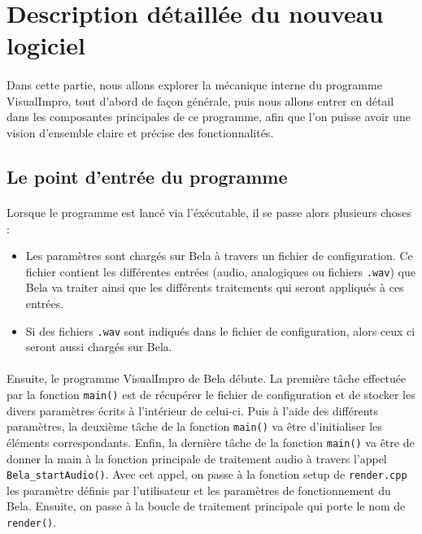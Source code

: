 \newpage

\section{Description détaillée du nouveau logiciel}
\paragraph{}
Dans cette partie, nous allons explorer la mécanique interne du programme VisualImpro, tout d'abord de façon générale, puis nous allons entrer en détail dans les composantes principales de ce programme, afin que l'on puisse avoir une vision d'ensemble claire et précise des fonctionnalités.
\subsection{Le point d'entrée du programme}
\paragraph{}
Lorsque le programme est lancé via l'éxécutable, il se passe alors plusieurs choses :
\begin{itemize}
    \item Les paramètres sont chargés sur Bela à travers un fichier de configuration. Ce fichier contient les différentes entrées (audio, analogiques ou fichiers \verb!.wav!) que Bela va traiter ainsi que les différents traitements qui seront appliqués à ces entrées.
    \item Si des fichiers \verb!.wav! sont indiqués dans le fichier de configuration, alors ceux ci seront aussi chargés sur Bela.
\end{itemize}
\paragraph{}
Ensuite, le programme VisualImpro de Bela débute. La première tâche effectuée par la fonction \verb!main()! est de récupérer le fichier de configuration et de stocker les divers paramètres écrits à l'intérieur de celui-ci. Puis à l'aide des différents paramètres, la deuxième tâche de la fonction \verb!main()!
va être d'initialiser les éléments correspondants. Enfin, la dernière tâche de la fonction \verb!main()! va être de donner la main à la fonction principale de traitement audio à travers l'appel \verb!Bela_startAudio()!. Avec cet appel, on passe à la fonction setup de \verb!render.cpp! les paramètre définis par l'utilisateur et les paramètres de fonctionnement du Bela. Ensuite, on passe à la boucle de traitement principale qui porte le nom de \verb!render()!.
